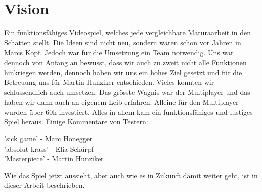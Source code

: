 \chapter{Vision}

Ein funktionsfähiges Videospiel, welches jede vergleichbare Maturaarbeit in den Schatten stellt.
Die Ideen sind nicht neu, sondern waren schon vor Jahren in Marcs Kopf.
Jedoch war für die Umsetzung ein Team notwendig.
Uns war dennoch von Anfang an bewusst,
dass wir auch zu zweit nicht alle Funktionen hinkriegen werden, dennoch haben wir uns ein hohes Ziel gesetzt und für die Betreuung uns für Martin Hunziker entschieden.
Vieles konnten wir schlussendlich auch umsetzen.
Das grösste Wagnis war der Multiplayer und das haben wir dann auch an eigenem Leib erfahren.
Alleine für den Multiplayer wurden über 60h investiert.
Alles in allem kam ein funktionsfähiges und lustiges Spiel heraus.
Einige Kommentare von Testern:
\begin{center}
    'sick game' - Marc Honegger \\
    'absolut krass' - Elia Schürpf \\ 
    'Masterpiece' - Martin Hunziker
\end{center}
Wie das Spiel jetzt aussieht, aber auch wie es in Zukunft damit weiter geht, ist in dieser Arbeit beschrieben.